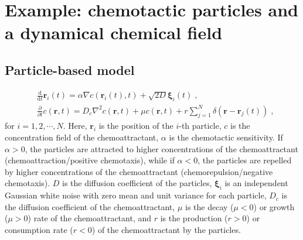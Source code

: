 \documentclass{article}
\begin{document}

\section{Example: chemotactic particles and a dynamical chemical field}
\label{sec:chemoExample}

\subsection{Particle-based model}
\begin{subequations}
    \begin{align}
        &\frac{\mathrm{d}}{\mathrm{d}t}\mathbf{r}_i\left( t \right) =\alpha \nabla c\left( \mathbf{r}_i\left( t \right) ,t \right) +\sqrt{2D}\boldsymbol{\xi }_i\left( t \right) \;,\\
        &\frac{\partial}{\partial t} c \left( \mathbf{r},t \right) =D_c\nabla ^2c\left( \mathbf{r},t \right) +\mu c\left( \mathbf{r},t \right) +r\sum_{j=1}^{N}{\delta \left( \mathbf{r}-\mathbf{r}_j\left( t \right) \right)}\;,
    \end{align}
\end{subequations}
for $i=1,2,\cdots,N$. Here, $\mathbf{r}_i$ is the position of the $i$-th particle, $c$ is the concentration field of the chemoattractant, $\alpha$ is the chemotactic sensitivity. If $\alpha > 0$, the particles are attracted to higher concentrations of the chemoattractant (chemoattraction/positive chemotaxis), while if $\alpha < 0$, the particles are repelled by higher concentrations of the chemoattractant (chemorepulsion/negative chemotaxis).
$D$ is the diffusion coefficient of the particles, $\boldsymbol{\xi }_i$ is an independent Gaussian white noise with zero mean and unit variance for each particle, $D_c$ is the diffusion coefficient of the chemoattractant, $\mu$ is the decay ($\mu < 0$) or growth ($\mu > 0$) rate of the chemoattractant, and $r$ is the production ($r > 0$) or consumption rate ($r < 0$) of the chemoattractant by the particles.
\end{document}
